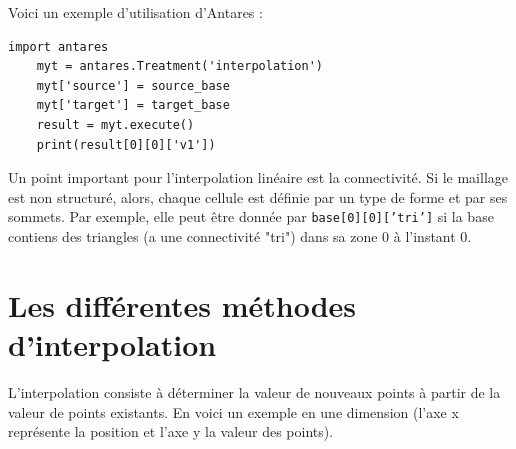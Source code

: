 Voici un exemple d'utilisation d'Antares :

\begin{lstlisting}[caption=Exemple simple d'utilisation d'Antares pour interpoler, label={lst:antares_2}]
    import antares
    myt = antares.Treatment('interpolation')
    myt['source'] = source_base
    myt['target'] = target_base
    result = myt.execute()
    print(result[0][0]['v1'])
\end{lstlisting}

Un point important pour l'interpolation linéaire est la connectivité. Si le maillage est non structuré, alors, chaque cellule est définie par un type de forme et par ses sommets. Par exemple, elle peut être donnée par \texttt{base[0][0]['tri']} si la base contiens des triangles (a une connectivité "tri") dans sa zone 0 à l'instant 0.


\section{Les différentes méthodes d'interpolation}

L'interpolation consiste à déterminer la valeur de nouveaux points à partir de la valeur de points existants. En voici un exemple en une dimension (l'axe x représente la position et l'axe y la valeur des points).

\vspace{0,5cm}


\begin{center}
\end{center}

